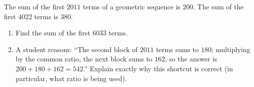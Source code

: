 The sum of the first $2011$ terms of a geometric sequence is $200$. The sum of the first $4022$ terms is $380$.
\begin{enumerate}
\item[(a)] Find the sum of the first $6033$ terms.
\item[(b)] A student reasons: ``The second block of $2011$ terms sums to $180$; multiplying by the common ratio, the next block sums to $162$, so the answer is $200+180+162=542$.'' Explain exactly why this shortcut is correct (in particular, what ratio is being used).
\end{enumerate}
